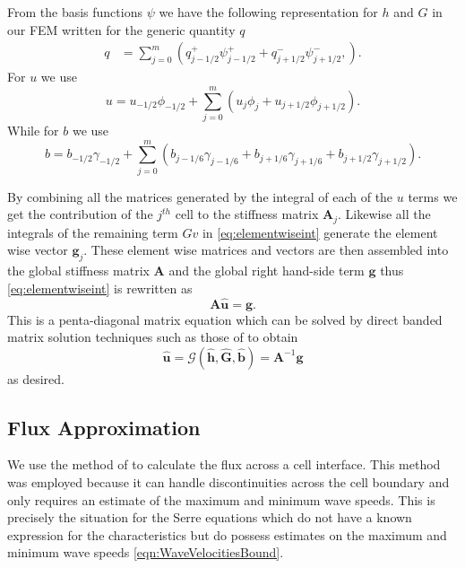 \documentclass[times]{elsarticle}
\newcommand{\matr}[1]{\mathbf{#1}}
\newcommand{\vecn}[1]{\boldsymbol{#1}}
\begin{document}
From the basis functions $\psi$ we have the following representation for $h$ and $G$ in our FEM written for the generic quantity $q$
\begin{align}
\label{eqn:FEapproxtohG}
q &= \sum_{j=0}^m \left( q^+_{j-1/2}\psi^+_{j-1/2}  + q^-_{j+1/2}\psi^-_{j+1/2}, \right).
\end{align}
For $u$ we use
\begin{equation}
u = u_{-1/2}\phi_{-1/2} + \sum_{j=0}^m \left( u_{j}\phi_{j} + u_{j+1/2}\phi_{j+1/2} \right).
\label{eqn:FEapproxtou}
\end{equation}
While for $b$ we use
\begin{equation}
b = b_{-1/2}\gamma_{-1/2} +  \sum_{j=0}^m \left(b_{j-1/6}\gamma_{j-1/6}  + b_{j+1/6}\gamma_{j+1/6} + b_{j+1/2}\gamma_{j+1/2} \right).
\label{eqn:FEapproxtob}
\end{equation}

By combining all the matrices generated by the integral of each of the $u$ terms we get the contribution of the $j^{th}$ cell to the stiffness matrix $\matr{A}_j$. Likewise all the integrals of the remaining term $Gv$ in \eqref{eq:elementwiseint} generate the element wise vector $\vecn{g}_{j}$. These element wise matrices and vectors are then assembled into the global stiffness matrix $\matr{A}$ and the global right hand-side term $\vecn{g}$ thus \eqref{eq:elementwiseint} is rewritten as
\begin{equation}
\label{eqn:FEMElemMatrixJ}
\matr{A} \vecn{\hat{u}} = \vecn{g}.
\end{equation}
This is a penta-diagonal matrix equation which can be solved by direct banded matrix solution techniques such as those of \citet{NumRecC-1996} to obtain
\begin{equation}
\vecn{\hat{u}} =\mathcal{G}\left( \vecn{\hat{h}}, \vecn{\hat{G}},\vecn{\hat{b}} \right) =   \matr{A}^{-1}\vecn{g}
\label{eqn:usolvefromGhb}
\end{equation}
as desired.

\subsection{Flux Approximation}
We use the method of \citet{Kurganov-etal-2001-707} to calculate the flux across a cell interface. This method was employed because it can handle discontinuities across the cell boundary and only requires an estimate of the maximum and minimum wave speeds. This is precisely the situation for the Serre equations which do not have a known expression for the characteristics but do possess estimates on the maximum and minimum wave speeds \eqref{eqn:WaveVelocitiesBound}.
\end{document}
